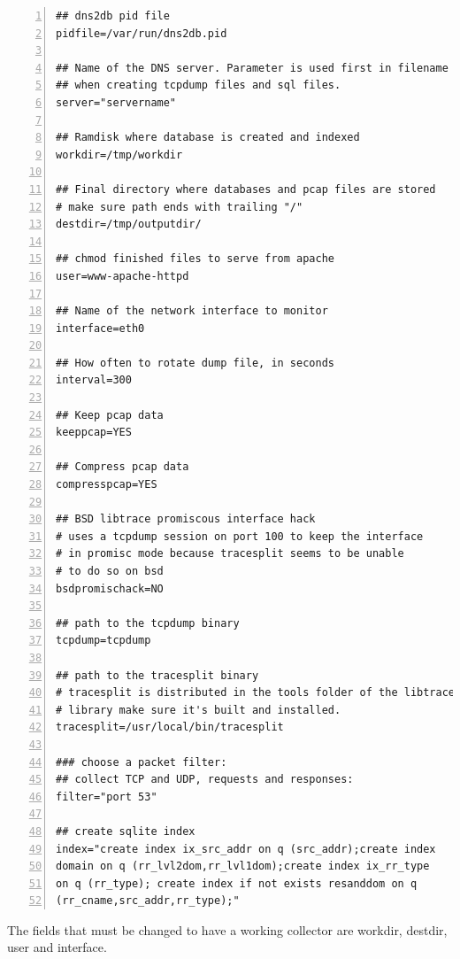 \documentclass[a4paper]{article}
\begin{document}
\begin{Verbatim}[fontsize=\relsize{-1},numbers=left]
## dns2db pid file
pidfile=/var/run/dns2db.pid

## Name of the DNS server. Parameter is used first in filename 
## when creating tcpdump files and sql files.
server="servername"

## Ramdisk where database is created and indexed
workdir=/tmp/workdir

## Final directory where databases and pcap files are stored
# make sure path ends with trailing "/"
destdir=/tmp/outputdir/

## chmod finished files to serve from apache
user=www-apache-httpd

## Name of the network interface to monitor
interface=eth0

## How often to rotate dump file, in seconds
interval=300

## Keep pcap data
keeppcap=YES

## Compress pcap data
compresspcap=YES

## BSD libtrace promiscous interface hack 
# uses a tcpdump session on port 100 to keep the interface 
# in promisc mode because tracesplit seems to be unable 
# to do so on bsd
bsdpromischack=NO

## path to the tcpdump binary
tcpdump=tcpdump

## path to the tracesplit binary
# tracesplit is distributed in the tools folder of the libtrace 
# library make sure it's built and installed.
tracesplit=/usr/local/bin/tracesplit

### choose a packet filter:
## collect TCP and UDP, requests and responses:
filter="port 53"

## create sqlite index
index="create index ix_src_addr on q (src_addr);create index 
domain on q (rr_lvl2dom,rr_lvl1dom);create index ix_rr_type 
on q (rr_type); create index if not exists resanddom on q 
(rr_cname,src_addr,rr_type);"
\end{Verbatim}

The fields that must be changed to have a working collector 
are workdir, destdir, user and interface.
\end{document}
